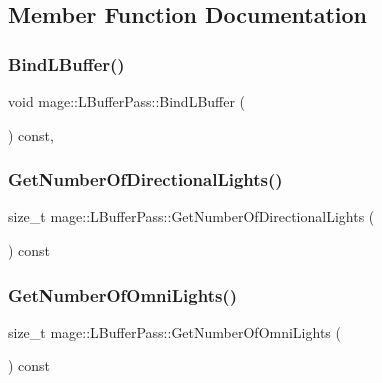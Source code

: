 \subsection{Member Function Documentation}
\hypertarget{classmage_1_1_l_buffer_pass_a1ed227fef9a19d8274519c8ff6277e35}{}\label{classmage_1_1_l_buffer_pass_a1ed227fef9a19d8274519c8ff6277e35} 
\subsubsection{\texorpdfstring{Bind\+L\+Buffer()}{BindLBuffer()}}
{\footnotesize\ttfamily void mage\+::\+L\+Buffer\+Pass\+::\+Bind\+L\+Buffer (\begin{DoxyParamCaption}{ }\end{DoxyParamCaption}) const\hspace{0.3cm}{\ttfamily [private]}, {\ttfamily [noexcept]}}

\hypertarget{classmage_1_1_l_buffer_pass_a8a8c7af3c9c780f378411b928bb15a67}{}\label{classmage_1_1_l_buffer_pass_a8a8c7af3c9c780f378411b928bb15a67} 
\subsubsection{\texorpdfstring{Get\+Number\+Of\+Directional\+Lights()}{GetNumberOfDirectionalLights()}}
{\footnotesize\ttfamily size\+\_\+t mage\+::\+L\+Buffer\+Pass\+::\+Get\+Number\+Of\+Directional\+Lights (\begin{DoxyParamCaption}{ }\end{DoxyParamCaption}) const\hspace{0.3cm}{\ttfamily [noexcept]}}

\hypertarget{classmage_1_1_l_buffer_pass_a36adecea35365ec4ecc97698de68463c}{}\label{classmage_1_1_l_buffer_pass_a36adecea35365ec4ecc97698de68463c} 
\subsubsection{\texorpdfstring{Get\+Number\+Of\+Omni\+Lights()}{GetNumberOfOmniLights()}}
{\footnotesize\ttfamily size\+\_\+t mage\+::\+L\+Buffer\+Pass\+::\+Get\+Number\+Of\+Omni\+Lights (\begin{DoxyParamCaption}{ }\end{DoxyParamCaption}) const\hspace{0.3cm}{\ttfamily [noexcept]}}


